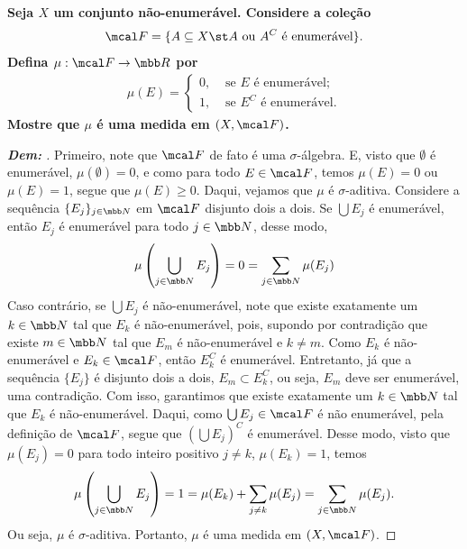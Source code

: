 \biglinend
\newpage 
{}
\myexe{\thedois}
\bigline
\textbf{Seja $X$ um conjunto não-enumerável. Considere a coleção 
$$\mcal F = \{A \subseteq X\st  A \text{ ou } A^C \text{ é enumerável}\}.$$ Defina $\mu: \mcal F\rightarrow \mbb R$
por 
\begin{align*}
  \mu(E) = \begin{cases}
    0, &\text{ se $E$ é enumerável;}\\
    1, &\text{ se $E^C$ é enumerável.}
  \end{cases}
\end{align*}
Mostre que $\mu$ é uma medida em $(X, \mcal F)$.
}
\begin{proof}[\textbf{Dem: }]
  Primeiro, note que $\mcal F$ de fato é uma $\sigma$-álgebra. E, visto 
  que $\emptyset$ é enumerável, $\mu(\emptyset) = 0$, e como para todo $E \in \mcal F$, temos $\mu(E) = 0$ 
  ou $\mu(E) = 1$, segue que $\mu(E) \ge 0$. Daqui, vejamos que $\mu$ é $\sigma$-aditiva. 
  Considere a sequência $\{E_j\}_{j \in \mbb N}$ em $\mcal F$ disjunto dois a dois. Se $\bigcup E_j$ é enumerável, 
  então $E_j$ é enumerável para todo $j \in \mbb N$, desse modo, 
  \begin{align*}
    \mu\left(\bigcup\limits_{j \in \mbb N} E_j\right) = 0 = \sum_{j \in \mbb N} \mu(E_j)
  \end{align*}
  Caso contrário, se $\bigcup E_j$ é não-enumerável, note que existe exatamente um $k \in \mbb N$ tal que $E_k$ é 
  não-enumerável, pois, supondo por contradição que existe $m \in \mbb N$ tal que $E_m$ é não-enumerável e $k \neq m$. 
  Como $E_k$ é não-enumerável e $E_k \in \mcal F$, então $E_k^C$ é enumerável. Entretanto, já que a sequência $\{E_j\}$
  é disjunto dois a dois, $E_m \subset E_k^C$, ou seja, $E_m$ deve ser enumerável, uma contradição. Com isso, garantimos 
  que existe exatamente um $k \in \mbb N$ tal que $E_k$ é não-enumerável. Daqui, como $\bigcup E_j \in \mcal F$ é não enumerável,
  pela definição de $\mcal F$, segue que 
  $\left(\bigcup E_j\right)^C$ é enumerável. Desse modo, visto que $\mu(E_j) = 0$ para todo 
  inteiro positivo $j \neq k$, $\mu(E_k) = 1$, temos
  \begin{align*}
    \mu\left(\bigcup\limits_{j \in \mbb N} E_j\right) = 1 = \mu(E_k) + \sum_{j \neq k} \mu(E_j) 
    = \sum_{j \in \mbb N} \mu(E_j).
  \end{align*}
  Ou seja, $\mu$ é $\sigma$-aditiva. Portanto, $\mu$ é uma medida em $(X, \mcal F)$.
\end{proof}


